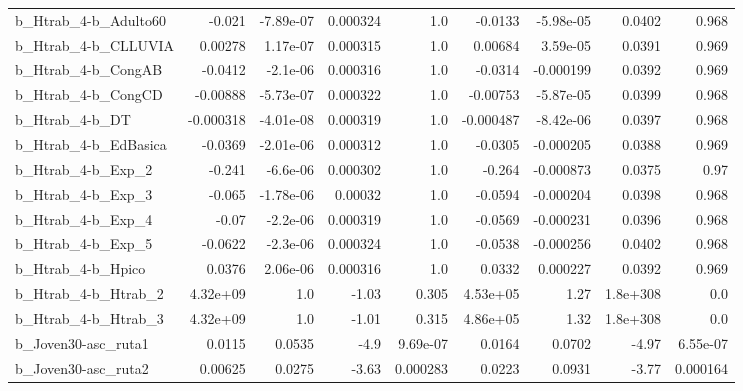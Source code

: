 \begin{tabular}{lrrrrrrrr}
b\_Htrab\_4-b\_Adulto60       &      -0.021 &    -7.89e-07 &  0.000324 &      1.0 &    -0.0133 &   -5.98e-05 &       0.0402 &         0.968 \\
b\_Htrab\_4-b\_CLLUVIA        &     0.00278 &     1.17e-07 &  0.000315 &      1.0 &    0.00684 &    3.59e-05 &       0.0391 &         0.969 \\
b\_Htrab\_4-b\_CongAB         &     -0.0412 &     -2.1e-06 &  0.000316 &      1.0 &    -0.0314 &   -0.000199 &       0.0392 &         0.969 \\
b\_Htrab\_4-b\_CongCD         &    -0.00888 &    -5.73e-07 &  0.000322 &      1.0 &   -0.00753 &   -5.87e-05 &       0.0399 &         0.968 \\
b\_Htrab\_4-b\_DT             &   -0.000318 &    -4.01e-08 &  0.000319 &      1.0 &  -0.000487 &   -8.42e-06 &       0.0397 &         0.968 \\
b\_Htrab\_4-b\_EdBasica       &     -0.0369 &    -2.01e-06 &  0.000312 &      1.0 &    -0.0305 &   -0.000205 &       0.0388 &         0.969 \\
b\_Htrab\_4-b\_Exp\_2          &      -0.241 &     -6.6e-06 &  0.000302 &      1.0 &     -0.264 &   -0.000873 &       0.0375 &          0.97 \\
b\_Htrab\_4-b\_Exp\_3          &      -0.065 &    -1.78e-06 &   0.00032 &      1.0 &    -0.0594 &   -0.000204 &       0.0398 &         0.968 \\
b\_Htrab\_4-b\_Exp\_4          &       -0.07 &     -2.2e-06 &  0.000319 &      1.0 &    -0.0569 &   -0.000231 &       0.0396 &         0.968 \\
b\_Htrab\_4-b\_Exp\_5          &     -0.0622 &     -2.3e-06 &  0.000324 &      1.0 &    -0.0538 &   -0.000256 &       0.0402 &         0.968 \\
b\_Htrab\_4-b\_Hpico          &      0.0376 &     2.06e-06 &  0.000316 &      1.0 &     0.0332 &    0.000227 &       0.0392 &         0.969 \\
b\_Htrab\_4-b\_Htrab\_2        &    4.32e+09 &          1.0 &     -1.03 &    0.305 &   4.53e+05 &        1.27 &     1.8e+308 &           0.0 \\
b\_Htrab\_4-b\_Htrab\_3        &    4.32e+09 &          1.0 &     -1.01 &    0.315 &   4.86e+05 &        1.32 &     1.8e+308 &           0.0 \\
b\_Joven30-asc\_ruta1        &      0.0115 &       0.0535 &      -4.9 & 9.69e-07 &     0.0164 &      0.0702 &        -4.97 &      6.55e-07 \\
b\_Joven30-asc\_ruta2        &     0.00625 &       0.0275 &     -3.63 & 0.000283 &     0.0223 &      0.0931 &        -3.77 &      0.000164 \\

\end{tabular}
